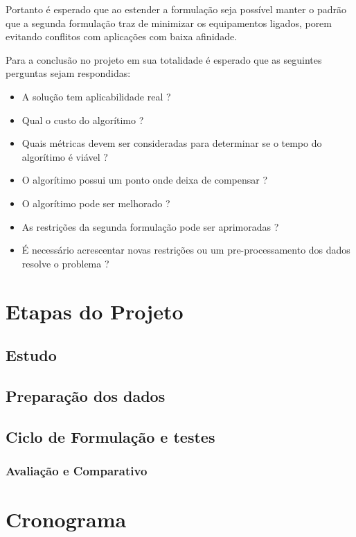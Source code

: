 Portanto é esperado que ao estender a formulação seja possível manter o padrão que a segunda formulação traz de minimizar os equipamentos ligados, porem evitando conflitos com aplicações com baixa afinidade.

Para a conclusão no projeto em sua totalidade é esperado que as seguintes perguntas sejam respondidas:

\begin{itemize}
    \item A solução tem aplicabilidade real ?
    \item Qual o custo do algorítimo ?
    \item Quais métricas devem ser consideradas para determinar se o tempo do algorítimo é viável ?
    \item O algorítimo possui um ponto onde deixa de compensar ?
    \item O algorítimo pode ser melhorado ? 
    \item As restrições da segunda formulação pode ser aprimoradas ?
    \item É necessário acrescentar novas restrições ou um pre-processamento dos dados resolve o problema ?  
\end{itemize}



\section{Etapas do Projeto}

\subsection{Estudo}
\subsection{Preparação dos dados}
\subsection{Ciclo de Formulação e testes}
\subsubsection{Avaliação e Comparativo}


\section[Cronograma]{Cronograma}
